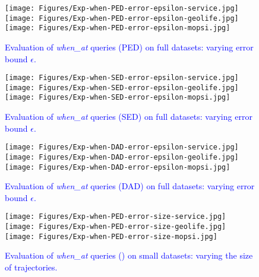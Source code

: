 {\begin{figure*}[tb!]
	\centering
	\texttt{[image: Figures/Exp-when-PED-error-epsilon-service.jpg]}\hspace{0.5ex}
	\texttt{[image: Figures/Exp-when-PED-error-epsilon-geolife.jpg]}\hspace{0.5ex}
	\texttt{[image: Figures/Exp-when-PED-error-epsilon-mopsi.jpg]}
	\vspace{-2ex}
	\caption{\small \textcolor{blue}{Evaluation of \emph{when\_at} queries (PED) on full datasets: varying error bound $\epsilon$.}}
	\label{fig:query-when-ped-epsilon}
	\vspace{-1.0ex}
\end{figure*}

\begin{figure*}[tb!]
	\centering
	\texttt{[image: Figures/Exp-when-SED-error-epsilon-service.jpg]}\hspace{0.5ex}
	\texttt{[image: Figures/Exp-when-SED-error-epsilon-geolife.jpg]}\hspace{0.5ex}
	\texttt{[image: Figures/Exp-when-SED-error-epsilon-mopsi.jpg]}
	\vspace{-2ex}
	\caption{\small \textcolor{blue}{Evaluation of \emph{when\_at} queries (SED) on full datasets: varying error bound $\epsilon$.}}
	\label{fig:query-when-sed-epsilon}
	\vspace{-1.0ex}
\end{figure*}

\begin{figure*}[tb!]
	\centering
	\texttt{[image: Figures/Exp-when-DAD-error-epsilon-service.jpg]}\hspace{0.5ex}
	\texttt{[image: Figures/Exp-when-DAD-error-epsilon-geolife.jpg]}\hspace{0.5ex}
	\texttt{[image: Figures/Exp-when-DAD-error-epsilon-mopsi.jpg]}
	\vspace{-2ex}
	\caption{\small \textcolor{blue}{Evaluation of \emph{when\_at} queries (DAD) on full datasets: varying error bound $\epsilon$.}}
	\label{fig:query-when-dad-epsilon}
	\vspace{-1.0ex}
\end{figure*}



\begin{figure*}[tb!]
	\centering
	\texttt{[image: Figures/Exp-when-PED-error-size-service.jpg]} 	\hspace{0.5ex}
	\texttt{[image: Figures/Exp-when-PED-error-size-geolife.jpg]}	\hspace{0.5ex}
	\texttt{[image: Figures/Exp-when-PED-error-size-mopsi.jpg]}		
	\vspace{-2ex}
	\caption{\small \textcolor{blue}{Evaluation of \emph{when\_at} queries (\ped) on small datasets: varying the size of
		trajectories.}}
	\label{fig:query-when-ped-size}
	\vspace{-1ex}
\end{figure*}

}
